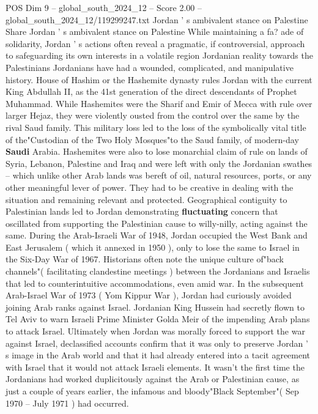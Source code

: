 \begin{textsample}{POS Dim 9 – global\_south\_2024\_12 – Score 2.00 – global\_south\_2024\_12/119299247.txt}  \label{ex:f9_pos_225}
Jordan ' s ambivalent stance on Palestine Share Jordan ' s ambivalent stance on Palestine While maintaining a fa? ade of solidarity, Jordan ' s actions often reveal a pragmatic, if controversial, approach to safeguarding its own interests in a volatile region Jordanian reality towards the Palestinians Jordanians have had a wounded, complicated, and manipulative history.
House of Hashim or the Hashemite dynasty rules Jordan with the current King Abdullah II, as the 41st generation of the direct descendants of Prophet Muhammad.
While Hashemites were the Sharif and Emir of Mecca with rule over larger Hejaz, they were violently ousted from the control over the same by the rival Saud family.
This military loss led to the loss of the symbolically vital title of the"Custodian of the Two Holy Mosques"to the Saud family, of modern-day \textbf{Saudi} Arabia.
Hashemites were also to lose monarchial claim of rule on lands of Syria, Lebanon, Palestine and Iraq and were left with only the Jordanian swathes -- which unlike other Arab lands was bereft of oil, natural resources, ports, or any other meaningful lever of power.
They had to be creative in dealing with the situation and remaining relevant and protected.
Geographical contiguity to Palestinian lands led to Jordan demonstrating \textbf{fluctuating} concern that oscillated from supporting the Palestinian cause to willy-nilly, acting against the same.
During the Arab-Israeli War of 1948, Jordan occupied the West Bank and East Jerusalem ( which it annexed in 1950 ), only to lose the same to Israel in the Six-Day War of 1967.
Historians often note the unique culture of"back channels"( facilitating clandestine meetings ) between the Jordanians and Israelis that led to counterintuitive accommodations, even amid war.
In the subsequent Arab-Israel War of 1973 ( Yom Kippur War ), Jordan had curiously avoided joining Arab ranks against Israel.
Jordanian King Hussein had secretly flown to Tel Aviv to warn Israeli Prime Minister Golda Meir of the impending Arab plans to attack Israel.
Ultimately when Jordan was morally forced to support the war against Israel, declassified accounts confirm that it was only to preserve Jordan ' s image in the Arab world and that it had already entered into a tacit agreement with Israel that it would not attack Israeli elements.
It wasn't the first time the Jordanians had worked duplicitously against the Arab or Palestinian cause, as just a couple of years earlier, the infamous and bloody"Black September"( Sep 1970 -- July 1971 ) had occurred.

\end{textsample}
